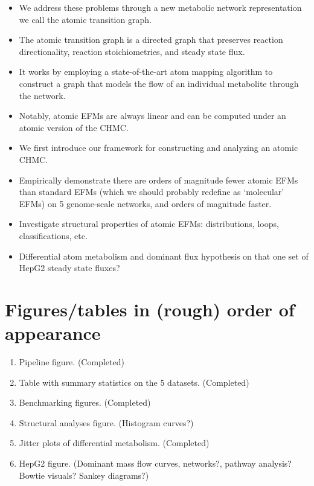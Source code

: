 \documentclass[11pt]{article}
\begin{document}
\begin{enumerate}
\begin{itemize}
        \item We address these problems through a new metabolic network representation we call the atomic transition graph.
        \item The atomic transition graph is a directed graph that preserves reaction directionality, reaction stoichiometries, and steady state flux.
        \item It works by employing a state-of-the-art atom mapping algorithm to construct a graph that models the flow of an individual metabolite through the network.
        \item Notably, atomic EFMs are always linear and can be computed under an atomic version of the CHMC.
        \item We first introduce our framework for constructing and analyzing an atomic CHMC.
        \item Empirically demonstrate there are orders of magnitude fewer atomic EFMs than standard EFMs (which we should probably redefine as `molecular' EFMs) on 5 genome-scale networks, and orders of magnitude faster.
        \item Investigate structural properties of atomic EFMs: distributions, loops, classifications, etc.
        \item Differential atom metabolism and dominant flux hypothesis on that one set of HepG2 steady state fluxes?
    \end{itemize}
\end{enumerate}


\section{Figures/tables in (rough) order of appearance}

\begin{enumerate}
    \item Pipeline figure. (Completed)
    \item Table with summary statistics on the 5 datasets. (Completed)
    \item Benchmarking figures. (Completed)
    \item Structural analyses figure. (Histogram curves?)
    \item Jitter plots of differential metabolism. (Completed)
    \item HepG2 figure. (Dominant mass flow curves, networks?, pathway analysis? Bowtie visuals? Sankey diagrams?)

\end{enumerate}
\end{document}
